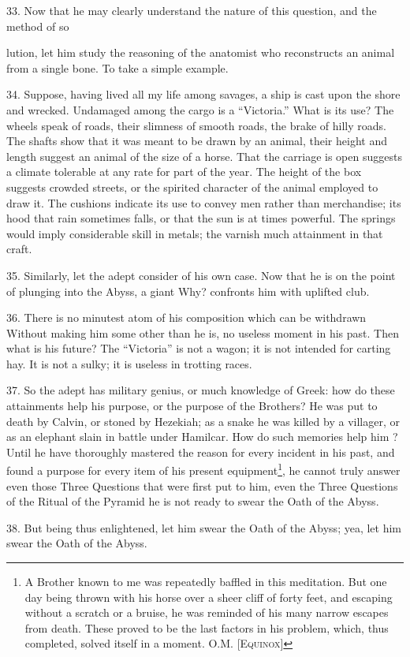 33. Now that he may clearly understand the nature of this question, and the method of so

lution, let him study the reasoning of the anatomist who reconstructs an animal from a single bone. To take a simple example.

34. Suppose, having lived all my life among savages, a ship is cast upon the shore and wrecked. Undamaged among the cargo is a \enquote{Victoria.} What is its use? The wheels speak of roads, their slimness of smooth roads, the brake of hilly roads. The shafts show that it was meant to be drawn by an animal, their height and length suggest an animal of the size of a horse. That the carriage is open suggests a climate tolerable at any rate for part of the year. The height of the box suggests crowded streets, or the spirited character of the animal employed to draw it. The cushions indicate its use to convey men rather than merchandise; its hood that rain sometimes falls, or that the sun is at times powerful. The springs would imply considerable skill in metals; the varnish much attainment in that craft.

35. Similarly, let the adept consider of his own case. Now that he is on the point of plunging into the Abyss, a giant Why? confronts him with uplifted club.

36. There is no minutest atom of his composition which can be withdrawn Without making him some other than he is, no useless moment in his past. Then what is his future? The \enquote{Victoria} is not a wagon; it is not intended for carting hay. It is not a sulky; it is useless in trotting races.

37. So the adept has military genius, or much knowledge of Greek: how do these attainments help his purpose, or the purpose of the Brothers? He was put to death by Calvin, or stoned by Hezekiah; as a snake he was killed by a villager, or as an elephant slain in battle under Hamilcar. How do such memories help him ? Until he have thoroughly mastered the reason for every incident in his past, and found a purpose for every item of his present equipment\footnote{A Brother known to me was repeatedly baffled in this meditation. But one day being thrown with his horse over a sheer cliff of forty feet, and escaping without a scratch or a bruise, he was reminded of his many narrow escapes from death. These proved to be the last factors in his problem, which, thus completed, solved itself in a moment. O.M. \textsc{[Equinox]}}, he cannot truly answer even those Three Questions that were first put to him, even the Three Questions of the Ritual of the Pyramid he is not ready to swear the Oath of the Abyss.

38. But being thus enlightened, let him swear the Oath of the Abyss; yea, let him swear the Oath of the Abyss.
